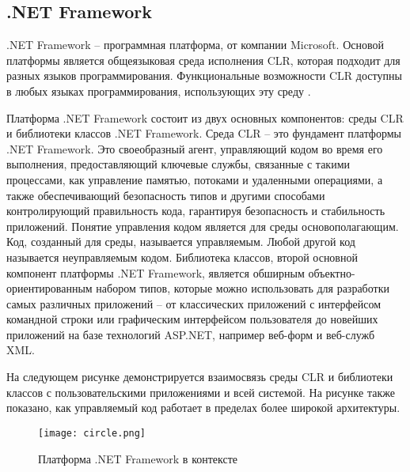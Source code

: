\subsection{.NET Framework}


.NET Framework – программная платформа, от компании Microsoft. Основой платформы является общеязыковая среда исполнения CLR, которая подходит для разных языков программирования. Функциональные возможности CLR доступны в любых языках программирования, использующих эту среду \cite{microsoft}.

Платформа  .NET Framework состоит из двух основных компонентов: среды CLR и библиотеки классов .NET Framework. Среда CLR – это фундамент платформы .NET Framework. Это своеобразный агент, управляющий кодом во время его выполнения, предоставляющий ключевые службы, связанные с такими процессами, как управление памятью, потоками и удаленными операциями, а также обеспечивающий безопасность типов и другими способами контролирующий правильность кода, гарантируя безопасность и стабильность приложений. Понятие управления кодом является для среды основополагающим. Код, созданный для среды, называется управляемым. Любой другой код называется неуправляемым кодом. Библиотека классов, второй основной компонент платформы .NET Framework, является обширным объектно-ориентированным набором типов, которые можно использовать для разработки самых различных приложений – от классических приложений с интерфейсом командной строки или графическим интерфейсом пользователя до новейших приложений на базе технологий ASP.NET, например веб-форм и веб-служб XML.

На следующем рисунке демонстрируется взаимосвязь среды CLR и библиотеки классов с пользовательскими приложениями и всей системой. На рисунке также показано, как управляемый код работает в пределах более широкой архитектуры.

\begin{figure}[h!]
	\centering
	\texttt{[image: circle.png]}
	\caption{Платформа .NET Framework в контексте}
\end{figure}

